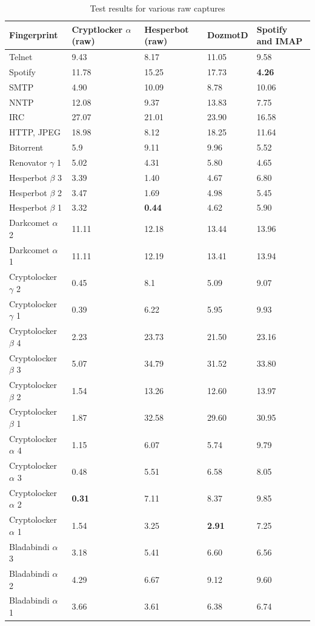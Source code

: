 \documentclass[13pt,journal,compsoc,onecolumn]{IEEEtran}
\begin{document}
\begin{table}[!ht]
\renewcommand{\arraystretch}{1.15}
\caption{Test results for various raw captures}
\label{table:testresults}

\begin{tabular}{|p{1.56cm}|p{1.4cm}|p{1.3cm}|p{1.2cm}|p{1.4cm}|}
\hline
Fingerprint& \textbf{Cryptlocker $\alpha$ (raw)}&\textbf{Hesperbot (raw)}&\textbf{DozmotD}&\textbf{Spotify and IMAP}\\
\hline
Telnet&9.43&8.17&11.05&9.58\\
\hline
Spotify&11.78&15.25&17.73&\textbf{4.26}\\
\hline
SMTP&4.90 &10.09&8.78&10.06\\
\hline
NNTP&12.08&9.37&13.83&7.75\\
\hline
IRC&27.07&21.01&23.90&16.58\\
\hline
HTTP, JPEG &18.98 &8.12&18.25&11.64\\
\hline
Bitorrent &5.9 &9.11&9.96&5.52\\
\hline
Renovator $\gamma$ 1 &5.02&4.31&5.80&4.65\\
\hline
Hesperbot $\beta$ 3 &3.39&1.40&4.67&6.80\\
\hline
Hesperbot $\beta$ 2 &3.47&1.69&4.98&5.45\\
\hline
Hesperbot $\beta$ 1 &3.32&\textbf{0.44}&4.62&5.90\\
\hline
Darkcomet $\alpha$ 2 &11.11&12.18&13.44&13.96\\
\hline
Darkcomet $\alpha$ 1 & 11.11&12.19&13.41&13.94\\
\hline
Cryptolocker $\gamma$ 2 &0.45&8.1&5.09&9.07\\
\hline
Cryptolocker $\gamma$ 1&0.39&6.22&5.95&9.93\\
\hline
Cryptolocker $\beta$ 4&2.23&23.73&21.50&23.16\\
\hline
Cryptolocker $\beta$ 3 &5.07&34.79&31.52&33.80\\
\hline
Cryptolocker $\beta$ 2&1.54&13.26&12.60&13.97\\
\hline
Cryptolocker $\beta$ 1&1.87&32.58&29.60&30.95\\
\hline
Cryptolocker $\alpha$ 4&1.15&6.07&5.74&9.79\\
\hline
Cryptolocker $\alpha$ 3&0.48&5.51&6.58&8.05\\
\hline
Cryptolocker $\alpha$ 2&\textbf{0.31}&7.11&8.37&9.85\\
\hline
Cryptolocker $\alpha$ 1&1.54&3.25&\textbf{2.91}&7.25\\
\hline
Bladabindi $\alpha$ 3&3.18&5.41&6.60&6.56\\
\hline
Bladabindi $\alpha$ 2&4.29&6.67&9.12&9.60\\
\hline
Bladabindi $\alpha$ 1&3.66&3.61&6.38&6.74\\
\hline
\end{tabular}
\\  
  

\end{table}
\end{document}
